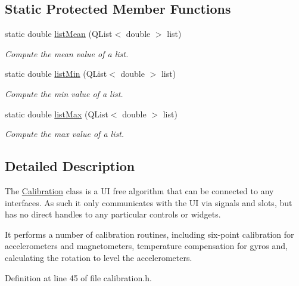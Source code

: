 \subsection*{\-Static \-Protected \-Member \-Functions}
\begin{DoxyCompactItemize}
\item 
static double \hyperlink{class_calibration_a95498e971c84717dd7aec18af86e008d}{list\-Mean} (\-Q\-List$<$ double $>$ list)
\begin{DoxyCompactList}\small\item\em \-Compute the mean value of a list. \end{DoxyCompactList}\item 
static double \hyperlink{class_calibration_a5eb9cfb2ba5165de6feea8dc94152d49}{list\-Min} (\-Q\-List$<$ double $>$ list)
\begin{DoxyCompactList}\small\item\em \-Compute the min value of a list. \end{DoxyCompactList}\item 
static double \hyperlink{class_calibration_a635535616022d0ffb41e1a9235d52787}{list\-Max} (\-Q\-List$<$ double $>$ list)
\begin{DoxyCompactList}\small\item\em \-Compute the max value of a list. \end{DoxyCompactList}\end{DoxyCompactItemize}


\subsection{\-Detailed \-Description}
\-The \hyperlink{class_calibration}{\-Calibration} class is a \-U\-I free algorithm that can be connected to any interfaces. \-As such it only communicates with the \-U\-I via signals and slots, but has no direct handles to any particular controls or widgets. 

\-It performs a number of calibration routines, including six-\/point calibration for accelerometers and magnetometers, temperature compensation for gyros and, calculating the rotation to level the accelerometers. 

\-Definition at line 45 of file calibration.\-h.



